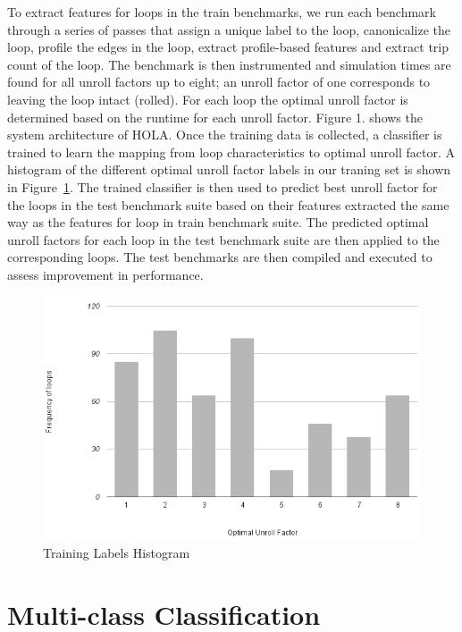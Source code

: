 \documentclass[]{sig-alternate}
\begin{document}
To extract features for loops in the train benchmarks, we run each benchmark through a series of passes that assign a unique label to the loop, canonicalize the loop, profile the edges in the loop, extract profile-based features and extract trip count of the loop. The benchmark is then instrumented and simulation times are found for all unroll factors up to eight; an unroll factor of one corresponds to leaving the loop intact (rolled). For each loop the optimal unroll factor is determined based on the runtime for each unroll factor. Figure 1. shows the system architecture of HOLA. Once the training data is collected, a classifier is trained to learn the mapping from loop characteristics to optimal unroll factor. A histogram of the different optimal unroll factor labels in our traning set is shown in Figure~\ref{fig:trainingHistogram}. The trained classifier is then used to predict best unroll factor for the loops in the test benchmark suite based on their features extracted the same way as the features for loop in train benchmark suite. The predicted optimal unroll factors for each loop in the test benchmark suite are then applied to the corresponding loops. The test benchmarks are then compiled and executed to assess improvement in performance. 


\begin{figure}
  \center
  \includegraphics[width=0.90\linewidth]{fig/histogram.png}
  \caption{Training Labels Histogram}
  \label{fig:trainingHistogram}
\end{figure}

\section{Multi-class Classification}
\label{sec:Multi-classClassification}
\end{document}
